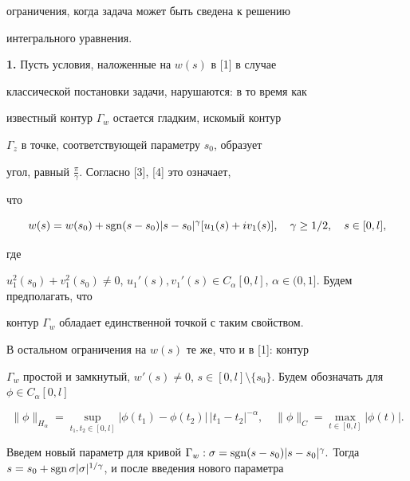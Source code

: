 ограничения, когда задача может быть сведена к решению


интегрального уравнения.


\medskip





{\bf 1.} Пусть условия, наложенные на $w(s)$ в [1] в случае


классической постановки задачи, нарушаются: в то время как


известный контур $\Gamma_w$ остается гладким, искомый контур


$\Gamma_z$ в точке, соответствующей параметру $s_0$, образует


угол, равный $\frac{\pi}{\gamma}$. Согласно [3], [4] это означает,


что


\begin{equation}


w(s) = w(s_0) + \sgn(s-s_0) |s-s_0|^{\gamma}[u_1(s) +


iv_1(s)],\quad \gamma \geq 1/2,\quad s \in [0,l],


\end{equation}


где


$u_1^2(s_0) + v_1^2(s_0) \ne 0$, $u_1'(s),v_1'(s) \in


C_{\alpha}[0,l]$, $\alpha \in (0,1].$ Будем предполагать, что


контур $\Gamma_w$ обладает единственной точкой с таким свойством.


В остальном ограничения на $w(s)$ те же, что и в [1]: контур


$\Gamma_w$ простой и замкнутый, $w'(s) \ne 0$, $s \in [0,l]


\setminus \{s_0\}$. Будем обозначать для $\phi \in


C_{\alpha}[0,l]$


$$


\|\phi\|_{H_{\alpha}} = \sup_{t_1,t_2 \in[0,l]}


|\phi(t_1) - \phi(t_2)|\,|t_1 - t_2|^{-\alpha},\quad \|\phi\|_C


= \max_{t\in [0,l]} |\phi(t)|.


$$


Введем новый параметр для кривой $\Gamma_w: \sigma =


\sgn(s-s_0)|s-s_0|^{\gamma}.$ Тогда $s=s_0 + \sgn \sigma


|\sigma|^{1/\gamma}$, и после введения нового параметра


